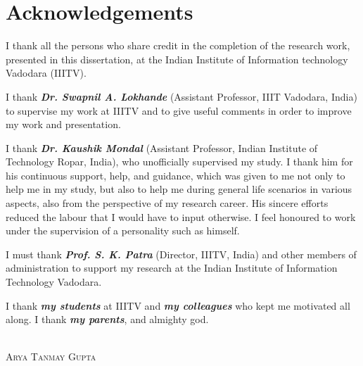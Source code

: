 \chapter*{Acknowledgements}

I thank all the persons who share credit in the completion of the research work, presented in this dissertation, at the Indian Institute of Information technology Vadodara (IIITV).

I thank \textbf{\textit{Dr. Swapnil A. Lokhande}} (Assistant Professor, IIIT Vadodara, India) to supervise my work at IIITV and to give useful comments in order to improve my work and presentation.

I thank \textbf{\textit{Dr. Kaushik Mondal}} (Assistant Professor, Indian Institute of Technology Ropar, India), who unofficially supervised my study. I thank him for his continuous support, help, and guidance, which was given to me not only to help me in my study, but also to help me during general life scenarios in various aspects, also from the perspective of my research career. His sincere efforts reduced the labour that I would have to input otherwise. I feel honoured to work under the supervision of a personality such as himself.

I must thank \textbf{\textit{Prof. S. K. Patra}} (Director, IIITV, India) and other members of administration to support my research at the Indian Institute of Information Technology Vadodara.

I thank \textbf{\textit{my students}} at IIITV and \textbf{\textit{my colleagues}} who kept me motivated all along. I thank \textbf{\textit{my parents}}, and almighty god.\\~\\

\begin{flushright}
\textsc{Arya Tanmay Gupta}
\end{flushright}